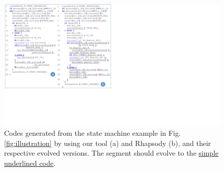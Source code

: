 \begin{figure}
	\centering
	\includegraphics[clip, trim=0.15cm 5.9cm 17.1cm 0.0cm, width=1.04\columnwidth]{figures/highlight.pdf}
	\caption{Codes generated from the state machine example in Fig. \ref{fig:illustration} by using our tool (a) and Rhapsody (b), and their respective evolved versions. The \protect{} segment should evolve to the \protect\uline{simple underlined code}.} 
	\label{fig:generatedcode}
\end{figure}




